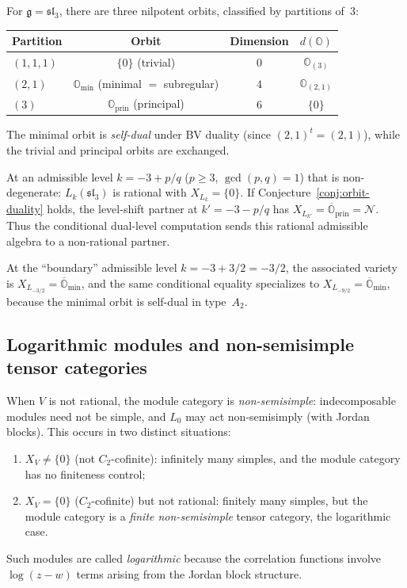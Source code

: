\begin{example}
\label{ex:orbit-duality-sl3}
For $\mathfrak{g} = \mathfrak{sl}_3$, there are three nilpotent
orbits, classified by partitions of~$3$:
\begin{center}
\renewcommand{\arraystretch}{1.3}
\begin{tabular}{lccc}
\toprule
\textbf{Partition} & \textbf{Orbit} & \textbf{Dimension}
& $d(\mathbb{O})$ \\
\midrule
$(1,1,1)$ & $\{0\}$ (trivial) & $0$ & $\mathbb{O}_{(3)}$ \\
$(2,1)$ & $\mathbb{O}_{\min}$ (minimal $=$ subregular)
& $4$ & $\mathbb{O}_{(2,1)}$ \\
$(3)$ & $\mathbb{O}_{\mathrm{prin}}$ (principal)
& $6$ & $\{0\}$ \\
\bottomrule
\end{tabular}
\end{center}
The minimal orbit is \emph{self-dual} under BV duality
(since $(2,1)^t = (2,1)$), while the trivial and principal
orbits are exchanged.

At an admissible level $k = -3 + p/q$ ($p \geq 3$,
$\gcd(p,q) = 1$) that is non-degenerate:
$L_k(\mathfrak{sl}_3)$ is rational with
$X_{L_k} = \{0\}$. If Conjecture~\ref{conj:orbit-duality} holds, the
level-shift partner at $k' = -3 - p/q$ has
$X_{L_{k'}} = \overline{\mathbb{O}}_{\mathrm{prin}} = \mathcal{N}$.
Thus the conditional dual-level computation sends this rational
admissible algebra to a non-rational partner.

At the ``boundary'' admissible level
$k = -3 + 3/2 = -3/2$, the associated variety is
$X_{L_{-3/2}} = \overline{\mathbb{O}}_{\min}$, and the same
conditional equality specializes to
$X_{L_{-9/2}}=\overline{\mathbb{O}}_{\min}$, because the minimal orbit
is self-dual in type~$A_2$.
\end{example}

\subsection{Logarithmic modules and non-semisimple tensor categories}
\label{sec:logarithmic-modules}

When $V$ is not rational, the module category is
\emph{non-semisimple}: indecomposable modules need not be
simple, and $L_0$ may act non-semisimply (with Jordan blocks).
This occurs in two distinct situations:
\begin{enumerate}[label=\textup{(\alph*)}]
\item $X_V \neq \{0\}$ (not $C_2$-cofinite): infinitely many
 simples, and the module category has no finiteness control;
\item $X_V = \{0\}$ ($C_2$-cofinite) but not rational:
 finitely many simples, but the module category is a
 \emph{finite non-semisimple} tensor category, the
 logarithmic case.
\end{enumerate}
Such modules are called \emph{logarithmic} because the
correlation functions involve $\log(z - w)$ terms arising from
the Jordan block structure.

